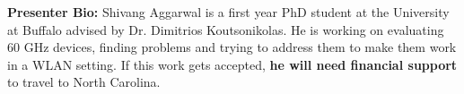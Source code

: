 \textbf{Presenter Bio: }
Shivang Aggarwal is a first year PhD student at the University at
Buffalo advised by Dr. Dimitrios Koutsonikolas. He is working
on evaluating 60 GHz devices, finding problems and trying to address
them to make them work in a WLAN setting. If this work gets
accepted, \textbf{he will need financial support} to travel to North
Carolina.
